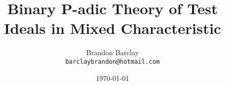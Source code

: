 \documentclass[12pt]{article}
\begin{document}
\title{Binary P-adic Theory of Test Ideals in Mixed Characteristic}
\author{Brandon Barclay \\ 
\texttt{barclaybrandon@hotmail.com}}
\date{\today}
\maketitle

\begin{abstract}

\end{abstract}












\appendix




\end{document}
